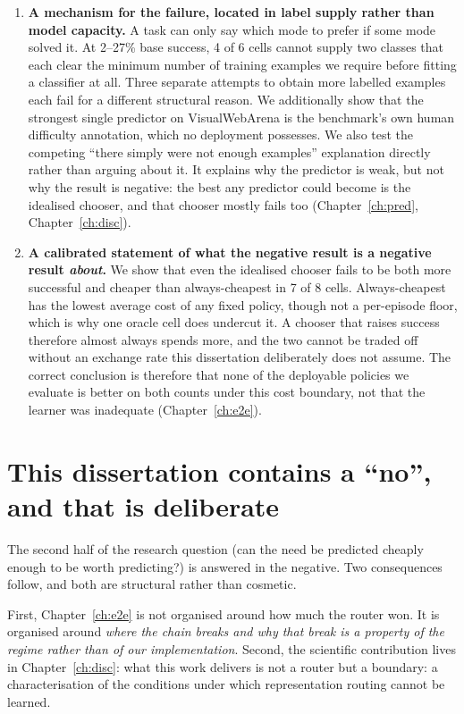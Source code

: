 \begin{enumerate}[leftmargin=1.5em]
\item \textbf{A mechanism for the failure, located in label supply rather than
      model capacity.} A task can only say which mode to prefer if some mode
      solved it. At 2--27\% base success, 4 of 6 cells cannot supply two
      classes that each clear the minimum number of training examples we
      require before fitting a classifier at all. Three separate attempts to obtain more labelled
      examples each fail for a different structural reason. We additionally
      show that the strongest single predictor on VisualWebArena is the
      benchmark's own human difficulty annotation, which no deployment possesses. We
      also test the competing ``there simply were not enough examples''
      explanation directly rather than arguing about it. It explains why the
      predictor is weak, but not why the result is negative: the best any
      predictor could become is the idealised chooser, and that chooser mostly
      fails too
      (Chapter~\ref{ch:pred}, Chapter~\ref{ch:disc}).

\item \textbf{A calibrated statement of what the negative result is a negative
      result \emph{about}.} We show that even the idealised chooser fails to
      be both more successful and cheaper than always-cheapest in 7 of 8
      cells. Always-cheapest has the lowest average cost of any fixed policy,
      though not a per-episode floor, which is why one oracle cell does
      undercut it. A chooser that raises success therefore almost always spends
      more, and the two cannot be traded off without an exchange rate this
      dissertation deliberately does not assume. The correct conclusion is
      therefore that none of the deployable policies we evaluate is better on
      both counts under this cost boundary, not that the learner was
      inadequate (Chapter~\ref{ch:e2e}).
\end{enumerate}

\FloatBarrier
\section{This dissertation contains a ``no'', and that is deliberate}
\label{sec:the-no}

The second half of the research question (can the need be predicted cheaply enough to be worth predicting?) is answered in the negative. Two consequences
follow, and both are structural rather than cosmetic.

First, Chapter~\ref{ch:e2e} is not organised around how much the router won. It
is organised around \emph{where the chain breaks and why that break is a
property of the regime rather than of our implementation}. Second, the
scientific contribution lives in Chapter~\ref{ch:disc}: what this work delivers
is not a router but a boundary: a characterisation of the conditions under
which representation routing cannot be learned.

